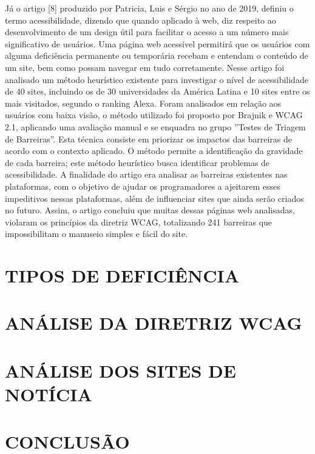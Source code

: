 \documentclass[a4paper]{article}
\begin{document}
\begin{titlepage}
Já o artigo [8] produzido por Patricia, Luis e Sérgio no ano de 2019, definiu o termo acessibilidade, dizendo que quando aplicado à web, diz respeito ao desenvolvimento de um design útil para facilitar o acesso a um número mais significativo de usuários. Uma página web acessível permitirá que os usuários com alguma deficiência permanente ou temporária recebam e entendam o conteúdo de um site, bem como possam navegar em tudo corretamente. Nesse artigo foi analisado um método heurístico existente para investigar o nível de acessibilidade de 40 sites, incluindo os de 30 universidades da América Latina e 10 sites entre os mais visitados, segundo o ranking Alexa. Foram analisados em relação aos usuários com baixa visão, o método utilizado foi proposto por Brajnik e WCAG 2.1, aplicando uma avaliação manual e se enquadra no grupo ''Testes de Triagem de Barreiras''. Esta técnica consiste em priorizar os impactos das barreiras de acordo com o contexto aplicado. O método permite a identificação da gravidade de cada barreira; este método heurístico busca identificar problemas de acessibilidade. A finalidade do artigo era analisar as barreiras existentes nas plataformas, com o objetivo de ajudar os programadores a ajeitarem esses impeditivos nessas plataformas, além de influenciar sites que ainda serão criados no futuro. Assim, o artigo concluiu que muitas dessas páginas web analisadas, violaram os princípios da diretriz WCAG, totalizando 241 barreiras que impossibilitam o manuseio simples e fácil do site.

\section{TIPOS DE DEFICIÊNCIA}
\section{ANÁLISE DA DIRETRIZ WCAG}
\section{ANÁLISE DOS SITES DE NOTÍCIA}
\section{CONCLUSÃO}

\end{titlepage}
\end{document}
